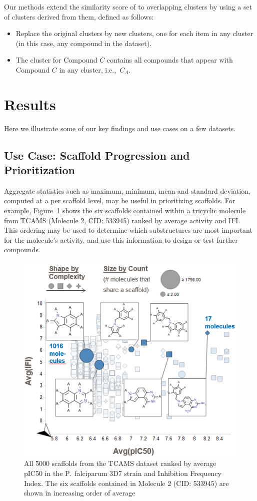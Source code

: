 \documentclass[journal=jacsat,manuscript=article]{achemso}
\newcommand*\fref[1]{Figure~\ref{fig:#1}}
\newcommand*\ie{i.e.,~}
\begin{document}
Our methods extend the similarity score of \citeauthor{Torres2009} to
overlapping clusters by using a set of clusters derived from them,
defined as follows:
\begin{itemize}
\item Replace the original clusters by new clusters, one for each item
  in any cluster (in this case, any compound in the dataset).
\item The cluster for Compound $C$ contains all compounds that appear
  with Compound $C$ in any cluster, \ie $C_A$.
\end{itemize}


\section{Results}
\label{sec:results}
Here we illustrate some of our key findings and use cases on a few datasets. 

\subsection{Use Case: Scaffold Progression and Prioritization}
Aggregate statistics such as maximum, minimum, mean and standard deviation, computed at a per scaffold level, may be useful in prioritizing scaffolds. For example, \fref{RGTaggr} shows the six scaffolds contained within a tricyclic molecule from TCAMS (Molecule 2, CID: 533945) ranked by average activity and IFI. This ordering may be used to determine which substructures are most important for the molecule's activity, and use this information to design or test further compounds.

\begin{figure}
  \includegraphics[width=5in]{fig/RGT_aggr_prop2.png}
  \caption{All \~5000 scaffolds from the TCAMS dataset ranked by average pIC50 in the P.~falciparum 3D7 strain and Inhibition Frequency Index. The six scaffolds contained in Molecule 2 (CID: 533945) are shown in increasing order of average }
\label{fig:RGTaggr}   
\end{figure}
\end{document}

